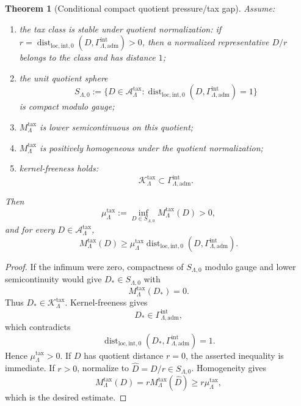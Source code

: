 \documentclass[11pt]{article}
\numberwithin{equation}{section}
\newtheorem{theorem}{Theorem}[section]
\theoremstyle{definition}
\theoremstyle{remark}
\newcommand{\loc}{\mathrm{loc}}
\newcommand{\adm}{\mathrm{adm}}
\newcommand{\Dist}{\operatorname{dist}}
\begin{document}
\begin{theorem}[Conditional compact quotient pressure/tax gap]
\label{thm:compact-tax-gap}
Assume:
\begin{enumerate}[label=\textup{(\roman*)},leftmargin=*]
    \item the tax class is stable under quotient normalization: if
    \(r=\Dist_{\loc,\mathrm{int},0}(D,\Gamma_{\Lambda,\adm}^{\mathrm{int}})>0\),
    then a normalized representative \(D/r\) belongs to the class and has
    distance \(1\);
    \item the unit quotient sphere
    \[
        S_{\Lambda,0}
        :=
        \{D\in\mathcal A_{\Lambda}^{\mathrm{tax}}:
        \Dist_{\loc,\mathrm{int},0}
        (D,\Gamma_{\Lambda,\adm}^{\mathrm{int}})=1\}
    \]
    is compact modulo gauge;
    \item \(M_{\Lambda}^{\mathrm{tax}}\) is lower semicontinuous on this
    quotient;
    \item \(M_{\Lambda}^{\mathrm{tax}}\) is positively homogeneous under the
    quotient normalization;
    \item kernel-freeness holds:
    \[
        \mathcal K_{\Lambda}^{\mathrm{tax}}
        \subset
        \Gamma_{\Lambda,\adm}^{\mathrm{int}}.
    \]
\end{enumerate}
Then
\[
    \mu_{\Lambda}^{\mathrm{tax}}
    :=
    \inf_{D\in S_{\Lambda,0}}
    M_{\Lambda}^{\mathrm{tax}}(D)
    >
    0,
\]
and for every \(D\in\mathcal A_{\Lambda}^{\mathrm{tax}}\),
\[
    M_{\Lambda}^{\mathrm{tax}}(D)
    \ge
    \mu_{\Lambda}^{\mathrm{tax}}
    \Dist_{\loc,\mathrm{int},0}
    (D,\Gamma_{\Lambda,\adm}^{\mathrm{int}}).
\]
\end{theorem}

\begin{proof}
If the infimum were zero, compactness of \(S_{\Lambda,0}\) modulo gauge and
lower semicontinuity would give \(D_*\in S_{\Lambda,0}\) with
\[
    M_{\Lambda}^{\mathrm{tax}}(D_*)=0.
\]
Thus \(D_*\in\mathcal K_{\Lambda}^{\mathrm{tax}}\).  Kernel-freeness gives
\[
    D_*\in\Gamma_{\Lambda,\adm}^{\mathrm{int}},
\]
which contradicts
\[
    \Dist_{\loc,\mathrm{int},0}
    (D_*,\Gamma_{\Lambda,\adm}^{\mathrm{int}})=1.
\]
Hence \(\mu_{\Lambda}^{\mathrm{tax}}>0\).  If \(D\) has quotient distance
\(r=0\), the asserted inequality is immediate.  If \(r>0\), normalize to
\(\widehat D=D/r\in S_{\Lambda,0}\).  Homogeneity gives
\[
    M_{\Lambda}^{\mathrm{tax}}(D)
    =
    rM_{\Lambda}^{\mathrm{tax}}(\widehat D)
    \ge
    r\mu_{\Lambda}^{\mathrm{tax}},
\]
which is the desired estimate.
\end{proof}
\end{document}
